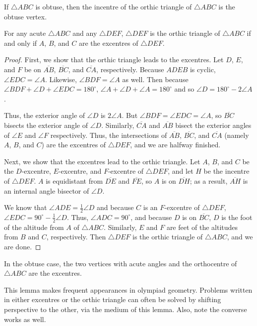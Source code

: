 If $\triangle ABC$ is obtuse, then the incentre of the orthic triangle of $\triangle ABC$ is the obtuse vertex.

\begin{proposition}
For any acute $\triangle ABC$ and any $\triangle DEF$, $\triangle DEF$ is the orthic triangle of $\triangle ABC$ if and only if $A$, $B$, and $C$ are the excentres of $\triangle DEF$.
\end{proposition}

\begin{proof}
First, we show that the orthic triangle leads to the excentres. Let $D$, $E$, and $F$ be on $\overline{AB}$, $\overline{BC}$, and $\overline{CA}$, respectively. Because $ADEB$ is cyclic, $\angle EDC = \angle A$. Likewise, $\angle BDF = \angle A$ as well. Then because $\angle BDF + \angle D + \angle EDC = 180^{\circ}$, $\angle A + \angle D + \angle A = 180^{\circ}$ and so $\angle D = 180^{\circ}-2\angle A$.

Thus, the exterior angle of $\angle D$ is $2\angle A$. But $\angle BDF = \angle EDC = \angle A$, so $\overline{BC}$ bisects the exterior angle of $\angle D$. Similarly, $\overline{CA}$ and $\overline{AB}$ bisect the exterior angles of $\angle E$ and $\angle F$ respectively. Thus, the intersections of $\overline{AB}$, $\overline{BC}$, and $\overline{CA}$ (namely $A$, $B$, and $C$) are the excentres of $\triangle DEF$, and we are halfway finished.

Next, we show that the excentres lead to the orthic triangle. Let $A$, $B$, and $C$ be the $D$-excentre, $E$-excentre, and $F$-excentre of $\triangle DEF$, and let $H$ be the incentre of $\triangle DEF$. $A$ is equidistant from $\overline{DE}$ and $\overline{FE}$, so $A$ is on $\overline{DH}$; as a result, $\overline{AH}$ is an internal angle bisector of $\angle D$.

We know that $\angle ADE = \frac{1}{2} \angle D$ and because $C$ is an $F$-excentre of $\triangle DEF$, $\angle EDC = 90^{\circ}-\frac{1}{2} \angle D$. Thus, $\angle ADC = 90^{\circ}$, and because $D$ is on $\overline{BC}$, $D$ is the foot of the altitude from $A$ of $\triangle ABC$. Similarly, $E$ and $F$ are feet of the altitudes from $B$ and $C$, respectively. Then $\triangle DEF$ is the orthic triangle of $\triangle ABC$, and we are done.
\end{proof}

In the obtuse case, the two vertices with acute angles and the orthocentre of $\triangle ABC$ are the excentres.

\begin{remark}
This lemma makes frequent appearances in olympiad geometry. Problems written in either excentres or the orthic triangle can often be solved by shifting perspective to the other, via the medium of this lemma. Also, note the converse works as well.
\end{remark}

